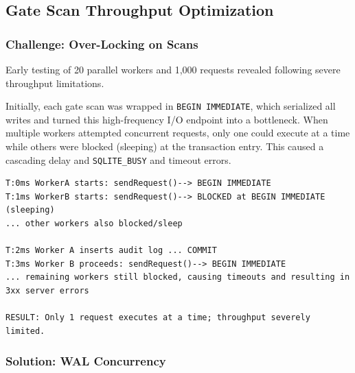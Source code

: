 \documentclass[sigconf]{acmart}
\begin{document}



\subsection{Gate Scan Throughput Optimization}

\subsubsection{Challenge: Over-Locking on Scans} Early testing of 20 parallel workers and 1,000 requests revealed following severe throughput limitations.

Initially, each gate scan was wrapped in \texttt{BEGIN IMMEDIATE}, which serialized all writes and turned this high-frequency I/O endpoint into a bottleneck. When multiple workers attempted concurrent requests, only one could execute at a time while others were blocked (sleeping) at the transaction entry. This caused a cascading delay and \texttt{SQLITE\_BUSY} and timeout errors.

\begin{lstlisting}[style=logstyle, caption={Race timeline with BEGIN IMMEDIATE on scans}]
T:0ms WorkerA starts: sendRequest()--> BEGIN IMMEDIATE
T:1ms WorkerB starts: sendRequest()--> BLOCKED at BEGIN IMMEDIATE (sleeping)
... other workers also blocked/sleep

T:2ms Worker A inserts audit log ... COMMIT
T:3ms Worker B proceeds: sendRequest()--> BEGIN IMMEDIATE
... remaining workers still blocked, causing timeouts and resulting in 3xx server errors

RESULT: Only 1 request executes at a time; throughput severely limited.
\end{lstlisting}

\subsubsection{Solution: WAL Concurrency}
\end{document}
